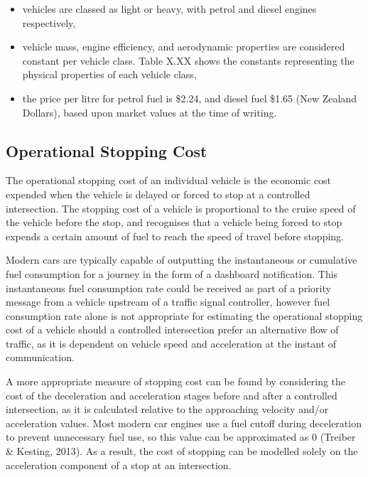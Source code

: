 \begin{itemize}
\item vehicles are classed as light or heavy, with petrol and diesel engines respectively,
\item vehicle mass, engine efficiency, and aerodynamic properties are considered constant per vehicle class. Table X.XX shows the constants representing the physical properties of each vehicle class,
\item the price per litre for petrol fuel is \$2.24, and diesel fuel \$1.65 (New Zealand Dollars), based upon market values at the time of writing.
\end{itemize}


\subsection{Operational Stopping Cost}

The operational stopping cost of an individual vehicle is the economic cost expended when the vehicle is delayed or forced to stop at a controlled intersection. The stopping cost of a vehicle is proportional to the cruise speed of the vehicle before the stop, and recognises that a vehicle being forced to stop expends a certain amount of fuel to reach the speed of travel before stopping.

Modern cars are typically capable of outputting the instantaneous or cumulative fuel consumption for a journey in the form of a dashboard notification. This instantaneous fuel consumption rate could be received as part of a priority message from a vehicle upstream of a traffic signal controller, however fuel consumption rate alone is not appropriate for estimating the operational stopping cost of a vehicle should a controlled intersection prefer an alternative flow of traffic, as it is dependent on vehicle speed and acceleration at the instant of communication.

A more appropriate measure of stopping cost can be found by considering the cost of the deceleration and acceleration stages before and after a controlled intersection, as it is calculated relative to the approaching velocity and/or acceleration values. Most modern car engines use a fuel cutoff during deceleration to prevent unnecessary fuel use, so this value can be approximated as 0 (Treiber & Kesting, 2013). As a result, the cost of stopping can be modelled solely on the acceleration component of a stop at an intersection.

